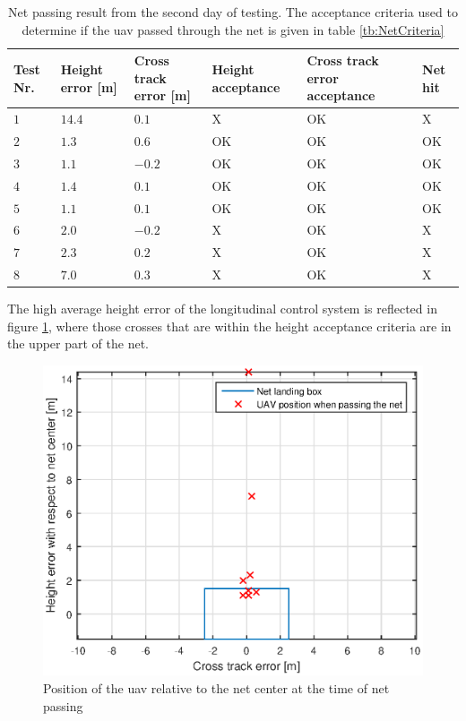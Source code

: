 \begin{table}[H]
\centering
\begin{tabular}{| p{0.5cm} | p{1cm} | p{1cm} | p{3.5cm} | p{3cm} | p{1cm} |}
\hline
\textbf{Test Nr.}	& \textbf{Height error [m]}	& \textbf{Cross track error [m]}& \textbf{Height acceptance}& \textbf{Cross track error acceptance}	& \textbf{Net hit}\\ \hline
$1$				& $14.4$		& $0.1$		& X								& OK									& X					\\ \hline
$2$				& $1.3$		& $0.6$	& OK								& OK										& OK					\\ \hline
$3$				& $1.1$		& $-0.2$	& OK							& OK									& OK				\\ \hline
$4$				& $1.4$		& $0.1$		& OK							& OK										& OK					\\ \hline
$5$				& $1.1$		& $0.1$		& OK							& OK										& OK					\\ \hline
$6$				& $2.0$		& $-0.2$	& X								& OK									& X					\\ \hline
$7$				& $2.3$		& $0.2$		& X								& OK									& X				\\ \hline
$8$				& $7.0$	& $0.3$			& X										& OK										& X					\\ \hline
\end{tabular}
\caption{Net passing result from the second day of testing. The acceptance criteria used to determine if the \gls{uav} passed through the net is given in table \ref{tb:NetCriteria}}
\label{tb:Day2LandingAttempt}
\end{table}
The high average height error of the longitudinal control system is reflected in figure \ref{Fig:Day2NetPass}, where those crosses that are within the height acceptance criteria are in the upper part of the net.
\begin{figure}[H]
\centering
\includegraphics[scale=0.7]{figs/Experiment/day2NetHit.eps}
\caption{Position of the \gls{uav} relative to the net center at the time of net passing}
\label{Fig:Day2NetPass}
\end{figure}
